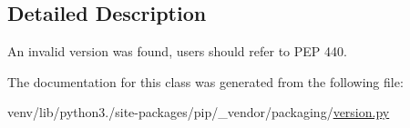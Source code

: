 \subsection{Detailed Description}
\begin{DoxyVerb}An invalid version was found, users should refer to PEP 440.
\end{DoxyVerb}
 

The documentation for this class was generated from the following file\+:\begin{DoxyCompactItemize}
\item 
venv/lib/python3./site-\/packages/pip/\+\_\+vendor/packaging/\hyperlink{pip_2__vendor_2packaging_2version_8py}{version.\+py}\end{DoxyCompactItemize}
